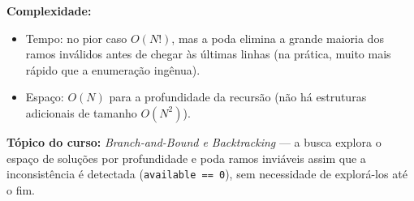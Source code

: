 \textbf{Complexidade:}
\begin{itemize}
    \item Tempo: no pior caso $O(N!)$, mas a poda elimina a grande maioria
    dos ramos inválidos antes de chegar às últimas linhas (na prática, muito
    mais rápido que a enumeração ingênua).
    \item Espaço: $O(N)$ para a profundidade da recursão (não há estruturas
    adicionais de tamanho $O(N^2)$).
\end{itemize}

\textbf{Tópico do curso:} \emph{Branch-and-Bound e Backtracking} --- a busca
explora o espaço de soluções por profundidade e poda ramos inviáveis assim
que a inconsistência é detectada (\texttt{available == 0}), sem necessidade
de explorá-los até o fim.
